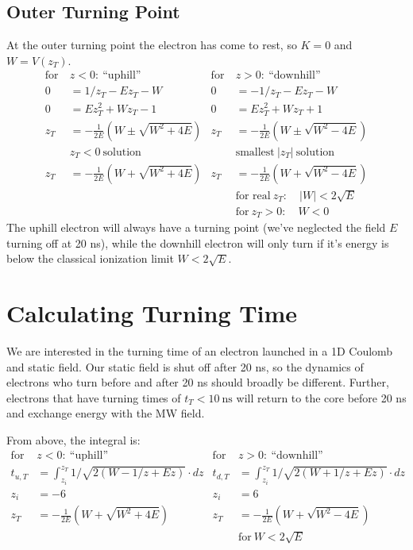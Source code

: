 \documentclass[aps,pra,preprint,groupedaddress]{revtex4-1}
\begin{document}
\subsection{\label{sec:zT} Outer Turning Point}

At the outer turning point the electron has come to rest, so $K=0$ and $W = V(z_T)$.
\begin{align*}
\text{for} ~ & z < 0: ~ \text{``uphill''} & \text{for} ~ & z > 0: ~ \text{``downhill''} \\
0 & = 1/z_T - Ez_T - W & 0 & = -1/z_T - Ez_T - W \\
0 & = Ez_T^2 + Wz_T - 1 & 0 & = Ez_T^2 + Wz_T + 1 \\
z_T & = -\frac{1}{2E} \left(W \pm \sqrt{W^2 + 4E}\right) & z_T & = -\frac{1}{2E} \left(W \pm \sqrt{W^2 - 4E}\right) \\
 & z_T < 0 ~ \text{solution} & & \text{smallest} ~ |z_T| ~ \text{solution} \\
z_T & = -\frac{1}{2E} \left(W + \sqrt{W^2 + 4E}\right) & z_T & = -\frac{1}{2E} \left(W + \sqrt{W^2 - 4E}\right) \\
 & & & \text{for real} ~ z_T: \quad |W| < 2\sqrt{E} \\
 & & & \text{for} ~ z_T > 0: \quad W < 0
\end{align*}
The uphill electron will always have a turning point (we've neglected the field $E$ turning off at 20 ns), while the downhill electron will only turn if it's energy is below the classical ionization limit $W < 2\sqrt{E}$.

\section{\label{sec:calct} Calculating Turning Time}

We are interested in the turning time of an electron launched in a 1D Coulomb and static field. Our static field is shut off after 20 ns, so the dynamics of electrons who turn before and after 20 ns should broadly be different. Further, electrons that have turning times of $t_T < 10 ~ \text{ns}$ will return to the core before 20 ns and exchange energy with the MW field.

From above, the integral is:
\begin{align*}
\text{for} ~ & z < 0: ~ \text{``uphill''} & \text{for} ~ & z > 0: ~ \text{``downhill''} \\
t_{u,T} & = \int_{z_i}^{z_T} 1/\sqrt{2(W - 1/z + Ez)} \cdot dz & t_{d,T} & = \int_{z_i}^{z_T} 1/\sqrt{2(W + 1/z + Ez)} \cdot dz \\
z_i & = -6 & z_i & = 6 \\
z_T & = -\frac{1}{2E} \left(W + \sqrt{W^2 + 4E}\right) & z_T & = -\frac{1}{2E} \left(W + \sqrt{W^2 - 4E}\right) \\
 & & & \text{for} ~ W < 2 \sqrt{E}
\end{align*}
\end{document}
